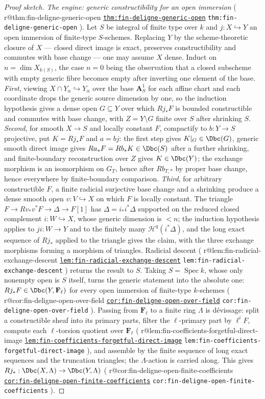 \documentclass[11pt]{article}
\makeatletter
\theoremstyle{plain}
\theoremstyle{definition}
\DeclareMathOperator{\Spec}{Spec}
\newcommand{\up}[1]{%
  \ifcsname r@#1\endcsname
    \hyperref[#1]{\texttt{\scriptsize #1}}%
  \else
    \texttt{\scriptsize #1}%
  \fi}
\makeatother
\begin{document}
\begin{proof}[Proof sketch]
\emph{The engine: generic constructibility for an open immersion}
(\up{thm:fin-deligne-generic-open}).  Let $S$ be integral of finite type over
$k$ and $j:X\hookrightarrow Y$ an open immersion of finite-type $S$-schemes.
Replacing $Y$ by the scheme-theoretic closure of $X$ --- closed direct image
is exact, preserves constructibility and commutes with base change --- one may
assume $X$ dense.  Induct on $n=\dim X_{k(S)}$, the case $n=0$ being the
observation that a closed subscheme with empty generic fibre becomes empty
after inverting one element of the base.  \emph{First}, viewing
$X\cap Y_\alpha\hookrightarrow Y_\alpha$ over the base $\mathbf A^1_S$ for
each affine chart and each coordinate drops the generic source dimension by
one, so the induction hypothesis gives a dense open $G\subseteq Y$ over which
$Rj_*F$ is bounded constructible and commutes with base change, with
$Z=Y\setminus G$ finite over $S$ after shrinking $S$.  \emph{Second}, for
smooth $X\to S$ and locally constant $F$, compactify to $b:Y\to S$
projective, put $K=Rj_*F$ and $a=bj$:  the first step gives $K|_G\in\Dbc(G)$,
generic smooth direct image gives $Ra_*F=Rb_*K\in\Dbc(S)$ after a further
shrinking, and finite-boundary reconstruction over $Z$ gives $K\in\Dbc(Y)$;
the exchange morphism is an isomorphism on $G_T$, hence after $Rb_{T,*}$ by
proper base change, hence everywhere by finite-boundary comparison.
\emph{Third}, for arbitrary constructible $F$, a finite radicial surjective
base change and a shrinking produce a dense smooth open $v:V\hookrightarrow X$
on which $F$ is locally constant.  The triangle
$F\to Rv_*v^*F\to\Delta\to F[1]$ has $\Delta=i_*i^*\Delta$ supported on the
reduced closed complement $i:W\hookrightarrow X$, whose generic dimension is
$<n$; the induction hypothesis applies to $ji:W\to Y$ and to the finitely many
$\mathcal H^q(i^*\Delta)$, and the long exact sequence of $Rj_*$ applied to
the triangle gives the claim, with the three exchange morphisms forming a
morphism of triangles.  Radicial descent
(\up{lem:fin-radicial-exchange-descent}) returns the result to $S$.  Taking
$S=\Spec k$, whose only nonempty open is $S$ itself, turns the generic
statement into the absolute one:  $Rj_*F\in\Dbc(Y,\mathbf F_\ell)$ for every
open immersion of finite-type $k$-schemes
(\up{cor:fin-deligne-open-over-field}).  Passing from $\mathbf F_\ell$ to a
finite ring $\Lambda$ is d\'evissage:  split a constructible sheaf into its
primary parts, filter the $\ell$-primary part by $\ell^iF$, compute each
$\ell$-torsion quotient over $\mathbf F_\ell$
(\up{lem:fin-coefficients-forgetful-direct-image}), and assemble by the finite
sequence of long exact sequences and the truncation triangles; the $\Lambda$-action
is carried along.  This gives $Rj_*:\Dbc(X,\Lambda)\to\Dbc(Y,\Lambda)$
(\up{cor:fin-deligne-open-finite-coefficients}).


\end{proof}
\end{document}

